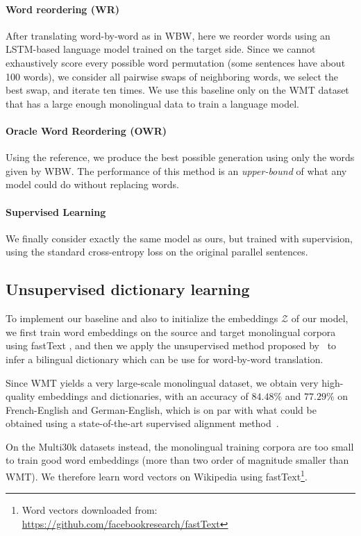 \paragraph{Word reordering (WR)} 
After translating word-by-word as in WBW, here we reorder words using an LSTM-based language model trained on the target side. Since we cannot exhaustively score every possible word permutation (some sentences have about 100 words), we consider all pairwise swaps of neighboring words, we select the best swap, and iterate ten times. We use this baseline only on the WMT dataset that has a large enough monolingual data to train a language model.

\paragraph{Oracle Word Reordering (OWR)} Using the reference, we produce the best possible generation using only the words given by WBW. The performance of this method is an \textit{upper-bound} of what any model could do without replacing words. 

\paragraph{Supervised Learning} 
We finally consider exactly the same model as ours, but trained with supervision, using the standard cross-entropy loss on the original parallel sentences.

\subsection{Unsupervised dictionary learning} To implement our baseline and also to initialize the embeddings $\mathcal{Z}$ of our model, we first train word embeddings on the source and target monolingual corpora using fastText \citep{bojanowski2016enriching}, and then we apply the unsupervised method proposed by~\citet{wordalign17} to infer a bilingual dictionary which can be use for word-by-word translation. 

Since WMT yields a very large-scale monolingual dataset, we obtain very high-quality embeddings and dictionaries, with an accuracy of $84.48\%$ and $77.29\%$ on French-English and German-English, which is on par with what could be obtained using a state-of-the-art supervised alignment method~\citep{wordalign17}.
 
On the Multi30k datasets instead, the monolingual training corpora are too small to train good word embeddings (more than two order of magnitude smaller than WMT). We therefore learn word vectors on Wikipedia using fastText\footnote{Word vectors downloaded from: \url{https://github.com/facebookresearch/fastText}}.

